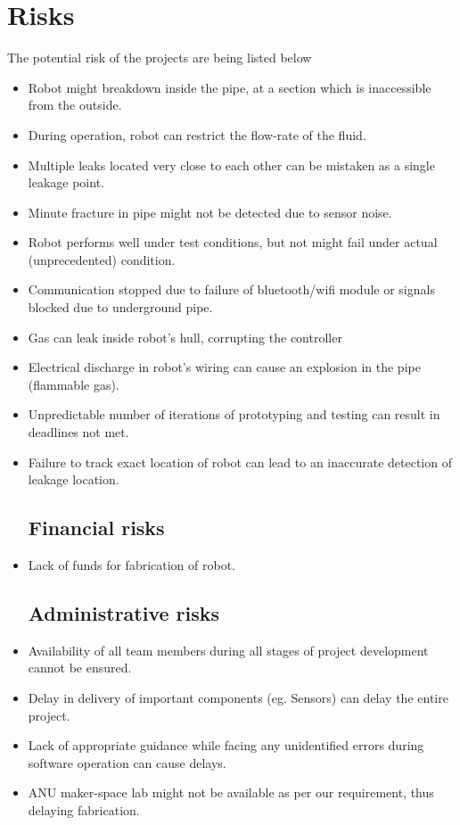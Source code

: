 \documentclass[a4paper]{article}
\begin{document}
\section{Risks}
\label{risks}
The potential risk of the projects are being listed below
\begin{itemize}
\subsection{Engineering risks}
    \item{Robot might breakdown inside the pipe, at a section which is inaccessible from the outside.}
    \item {During operation, robot can restrict the flow-rate of the fluid.}
    \item{Multiple leaks located very close to each other can be mistaken as a single leakage point.}
    \item{Minute fracture in pipe might not be detected due to sensor noise.}
    \item{Robot performs well under test conditions, but not might fail under actual (unprecedented) condition.}
    \item{Communication stopped due to failure of bluetooth/wifi module or signals blocked due to underground pipe.}
    \item{Gas can leak inside robot’s hull, corrupting the controller}
    \item{Electrical discharge in robot’s wiring can cause an explosion in the pipe (flammable gas).}
    \item{Unpredictable number of iterations of prototyping and testing can result in deadlines not met.}
    \item{Failure to track exact location of robot can lead to an inaccurate detection of leakage location.}
\subsection{Financial risks}
    \item{Lack of funds for fabrication of robot.}
\subsection{Administrative risks}
    \item{Availability of all team members during all stages of project development cannot be ensured.}
    \item{Delay in delivery of important components (eg. Sensors) can delay the entire project.}
    \item{Lack of appropriate guidance while facing any unidentified errors during software operation can cause delays.}
    \item{ANU maker-space lab might not be available as per our requirement, thus delaying fabrication.}

\end{itemize}
\end{document}

